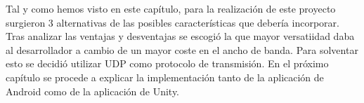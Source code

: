 Tal y como hemos visto en este cap\'itulo, para la realizaci\'on de este proyecto surgieron 3 alternativas de las posibles caracter\'isticas que deber\'ia incorporar. Tras analizar las ventajas y desventajas se escogi\'o la que mayor versatiidad daba al desarrollador a cambio de un mayor coste en el ancho de banda. Para solventar esto se decidi\'o utilizar UDP como protocolo de transmisi\'on. En el pr\'oximo cap\'itulo se procede a explicar la implementaci\'on tanto de la aplicaci\'on de Android como de  la aplicaci\'on de Unity. 


